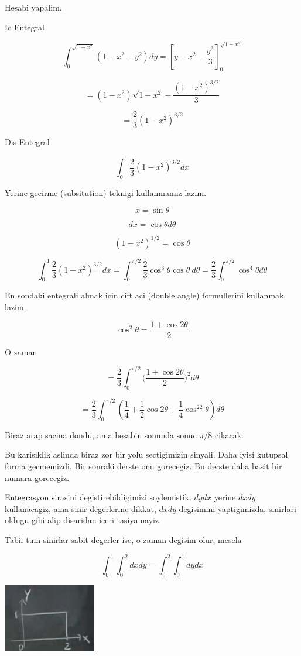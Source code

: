 \documentclass[12pt,fleqn]{article}\usepackage{../common}
\begin{document}
Hesabi yapalim. 

Ic Entegral 

\[  \int_0^{\sqrt{1-x^2}}  (1-x^2-y^2) dy = 
[ y - x^2 - \frac{y^3}{3} ]_0^{\sqrt{1-x^2}}
 \]

\[ =  (1-x^2)\sqrt{1-x^2} - \frac{(1-x^2)^{3/2}}{3}\]

\[ = \frac{2}{3} (1-x^2)^{3/2} \]

Dis Entegral

\[ \int_0^1 \frac{2}{3} (1-x^2)^{3/2} dx \]

Yerine gecirme (subsitution) teknigi kullanmamiz lazim. 

\[ x = \sin\theta \]

\[ dx = \cos\theta d\theta\]

\[ (1-x^2)^{1/2} = \cos\theta \]

\[ 
\int_0^1 \frac{2}{3} (1-x^2)^{3/2} dx = 
\int_0^{\pi/2} \frac{2}{3} \cos^3\theta \cos\theta \ d\theta = 
\frac{2}{3} \int_0^{\pi/2} \cos^4\theta d\theta
\]

En sondaki entegrali almak icin cift aci (double angle) formullerini
kullanmak lazim. 

\[ \cos^2\theta = \frac{1 + \cos 2\theta}{2} \]

O zaman 

\[ = 
\frac{2}{3} \int_0^{\pi/2} 
\bigg( \frac{1 + \cos 2\theta}{2} \bigg)^2 d\theta 
\]

\[ = \frac{2}{3} \int_0^{\pi/2} (
\frac{1}{4} + 
\frac{1}{2}\cos2\theta + 
\frac{1}{4}\cos^22\theta)d\theta
 \]

Biraz arap sacina dondu, ama hesabin sonunda sonuc $\pi/8$ cikacak. 

Bu karisiklik aslinda biraz zor bir yolu sectigimizin sinyali. Daha iyisi
kutupsal forma gecmemizdi. Bir sonraki derste onu gorecegiz. Bu derste daha
basit bir numara gorecegiz. 

Entegrasyon sirasini degistirebildigimizi soylemistik. $dy dx$ 
yerine $dx
dy$ kullanacagiz, ama sinir degerlerine dikkat, $dx dy$ degisimini
yaptigimizda, sinirlari oldugu gibi alip disaridan iceri tasiyamayiz. 

Tabii tum sinirlar sabit degerler ise, o zaman degisim olur, mesela

\[ \int_0^1 \int_0^2 dx dy =
\int_0^2 \int_0^1 dy dx
\]


\includegraphics[height=3cm]{16_12.png}
\end{document}
